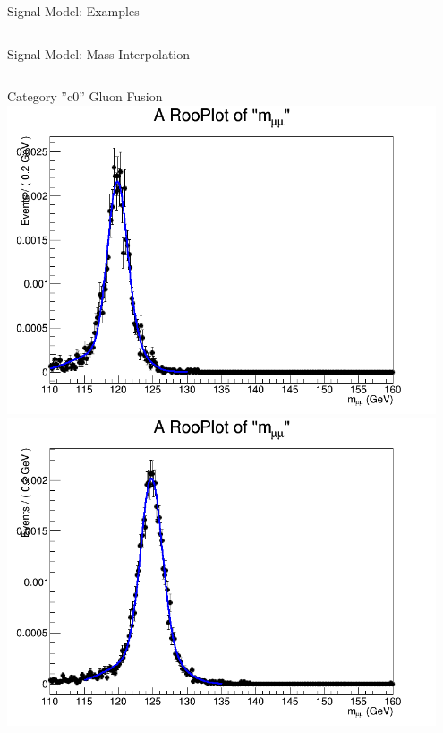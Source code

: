 \documentclass[pdf, 9pt]{beamer}
\begin{document}
\begin{frame}{Signal Model: Examples}
\begin{columns}[T]
\begin{column}{0.33\textwidth}
\begin{center}
        \end{center}
      \end{column}
    \end{columns}
  \end{frame}

    \begin{frame}[c]{Signal Model: Mass Interpolation}
    \vspace{-0.7cm}
    \begin{columns}[T]
      \begin{column}{0.4\textwidth}
        \begin{center}
          \tiny{Category ''c0'' Gluon Fusion}\\
          \includegraphics[width=0.95\textwidth, height=0.3\textheight]{figs/higgs/signalmodel/bdt/bdt_110to160_withSys/signalFit__c0__120__GluGlu__TripleGaus__default.png}\\
          \includegraphics[width=0.95\textwidth, height=0.3\textheight]{figs/higgs/signalmodel/bdt/bdt_110to160_withSys/signalFit__c0__125__GluGlu__TripleGaus__default.png}\\

\end{center}
\end{column}
\end{columns}
\end{frame}
\end{document}
